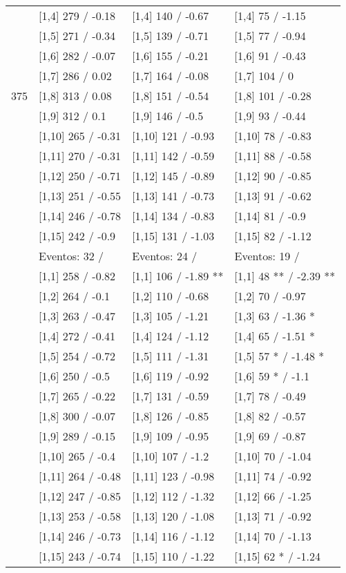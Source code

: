 \begin{table}
\begin{tabular}[t]{llll}
\addlinespace
 & {}[1,4] 279  / -0.18 & {}[1,4] 140  / -0.67 & {}[1,4] 75  / -1.15\\
 & {}[1,5] 271  / -0.34 & {}[1,5] 139  / -0.71 & {}[1,5] 77  / -0.94\\
 & {}[1,6] 282  / -0.07 & {}[1,6] 155  / -0.21 & {}[1,6] 91  / -0.43\\
 & {}[1,7] 286  / 0.02 & {}[1,7] 164  / -0.08 & {}[1,7] 104  / 0\\
375 & {}[1,8] 313  / 0.08 & {}[1,8] 151  / -0.54 & {}[1,8] 101  / -0.28\\
\addlinespace
 & {}[1,9] 312  / 0.1 & {}[1,9] 146  / -0.5 & {}[1,9] 93  / -0.44\\
 & {}[1,10] 265  / -0.31 & {}[1,10] 121  / -0.93 & {}[1,10] 78  / -0.83\\
 & {}[1,11] 270  / -0.31 & {}[1,11] 142  / -0.59 & {}[1,11] 88  / -0.58\\
 & {}[1,12] 250  / -0.71 & {}[1,12] 145  / -0.89 & {}[1,12] 90  / -0.85\\
 & {}[1,13] 251  / -0.55 & {}[1,13] 141  / -0.73 & {}[1,13] 91  / -0.62\\
\addlinespace
 & {}[1,14] 246  / -0.78 & {}[1,14] 134  / -0.83 & {}[1,14] 81  / -0.9\\
 & {}[1,15] 242  / -0.9 & {}[1,15] 131  / -1.03 & {}[1,15] 82  / -1.12\\
 & Eventos:  32 / & Eventos:  24 / & Eventos:  19 /\\
 & {}[1,1] 258  / -0.82 & {}[1,1] 106  / -1.89 ** & {}[1,1] 48 ** / -2.39 **\\
 & {}[1,2] 264  / -0.1 & {}[1,2] 110  / -0.68 & {}[1,2] 70  / -0.97\\
\addlinespace
 & {}[1,3] 263  / -0.47 & {}[1,3] 105  / -1.21 & {}[1,3] 63  / -1.36 *\\
 & {}[1,4] 272  / -0.41 & {}[1,4] 124  / -1.12 & {}[1,4] 65  / -1.51 *\\
 & {}[1,5] 254  / -0.72 & {}[1,5] 111  / -1.31 & {}[1,5] 57 * / -1.48 *\\
 & {}[1,6] 250  / -0.5 & {}[1,6] 119  / -0.92 & {}[1,6] 59 * / -1.1\\
 & {}[1,7] 265  / -0.22 & {}[1,7] 131  / -0.59 & {}[1,7] 78  / -0.49\\
\addlinespace
500 & {}[1,8] 300  / -0.07 & {}[1,8] 126  / -0.85 & {}[1,8] 82  / -0.57\\
 & {}[1,9] 289  / -0.15 & {}[1,9] 109  / -0.95 & {}[1,9] 69  / -0.87\\
 & {}[1,10] 265  / -0.4 & {}[1,10] 107  / -1.2 & {}[1,10] 70  / -1.04\\
 & {}[1,11] 264  / -0.48 & {}[1,11] 123  / -0.98 & {}[1,11] 74  / -0.92\\
 & {}[1,12] 247  / -0.85 & {}[1,12] 112  / -1.32 & {}[1,12] 66  / -1.25\\
\addlinespace
 & {}[1,13] 253  / -0.58 & {}[1,13] 120  / -1.08 & {}[1,13] 71  / -0.92\\
 & {}[1,14] 246  / -0.73 & {}[1,14] 116  / -1.12 & {}[1,14] 70  / -1.13\\
 & {}[1,15] 243  / -0.74 & {}[1,15] 110  / -1.22 & {}[1,15] 62 * / -1.24\\
\bottomrule
\end{tabular}
\end{table}
